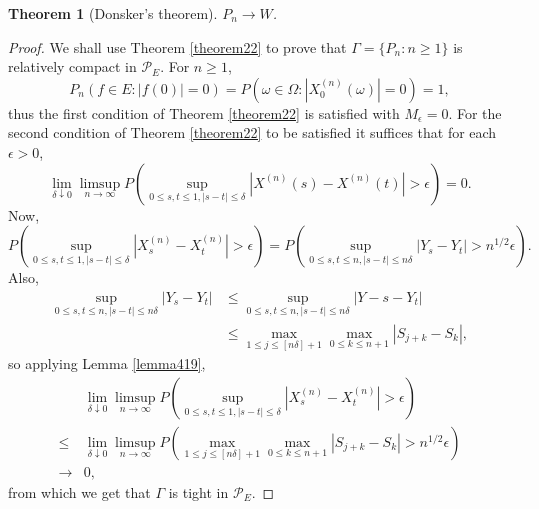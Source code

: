\documentclass{article}
\newtheorem{theorem}{Theorem}
\theoremstyle{definition}
\begin{document}
\begin{theorem}[Donsker's theorem]
$P_n \to W$.
\end{theorem}
\begin{proof}
We shall use Theorem \ref{theorem22} to prove that $\Gamma = \{P_n : n \geq 1\}$ is relatively compact in $\mathscr{P}_E$. 
For $n \geq 1$, 
\[
P_n( f \in E: |f(0)| = 0) = P(\omega \in \Omega : |X_0^{(n)}(\omega)|=0) = 1,
\]
thus the first condition of Theorem \ref{theorem22} is satisfied with $M_\epsilon=0$.
For the second condition of Theorem \ref{theorem22} to be satisfied it suffices that for each $\epsilon>0$,
\[
\lim_{\delta \downarrow 0} \limsup_{n \to \infty} P\left( \sup_{0 \leq s,t \leq 1, |s-t| \leq \delta} |X^{(n)}(s)-X^{(n)}(t)| > \epsilon\right) = 0.
\]
Now,
\[
P\left( \sup_{0 \leq s,t \leq 1, |s-t| \leq \delta} |X^{(n)}_s-X^{(n)}_t| > \epsilon\right) = P\left(\sup_{0 \leq s,t \leq n, |s-t| \leq n\delta} |Y_s-Y_t| > n^{1/2} \epsilon\right).
\]
Also,
\begin{align*}
\sup_{0 \leq s,t \leq n, |s-t| \leq n\delta} |Y_s-Y_t|& \leq \sup_{0 \leq s,t \leq n, |s-t| \leq n\delta} |Y-s-Y_t| \\
&\leq \max_{1 \leq j \leq [n\delta]+1} \max_{0 \leq k \leq n+1} |S_{j+k}-S_k|,
\end{align*}
so 
applying Lemma \ref{lemma419},
\[
\begin{split}
&\lim_{\delta \downarrow 0} \limsup_{n \to \infty} 
P\left( \sup_{0 \leq s,t \leq 1, |s-t| \leq \delta} |X^{(n)}_s-X^{(n)}_t| > \epsilon\right) \\
\leq&\lim_{\delta \downarrow 0} \limsup_{n \to \infty} P\left( \max_{1 \leq j \leq [n\delta]+1} \max_{0 \leq k \leq n+1} |S_{j+k}-S_k| > n^{1/2} \epsilon\right)\\
\to&0,
\end{split}
\]
from which we get that $\Gamma$ is tight in $\mathscr{P}_E$. 
\end{proof}
\end{document}
